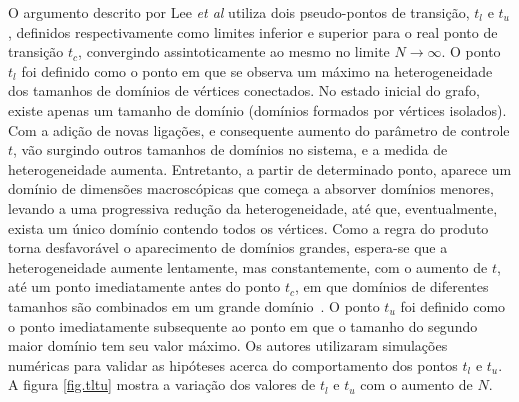 O argumento descrito por Lee \textit{et al} utiliza dois pseudo-pontos de transição, $t_l$ e $t_u$, definidos respectivamente como limites inferior e superior para o real ponto de transição $t_c$, convergindo assintoticamente ao mesmo no limite $N \rightarrow \infty$. O ponto $t_l$ foi definido como o ponto em que se observa um máximo na heterogeneidade dos tamanhos de domínios de vértices conectados. No estado inicial do grafo, existe apenas um tamanho de domínio (domínios formados por vértices isolados). Com a adição de novas ligações, e consequente aumento do parâmetro de controle $t$, vão surgindo outros tamanhos de domínios no sistema, e a medida de heterogeneidade aumenta. Entretanto, a partir de determinado ponto, aparece um domínio de dimensões macroscópicas que começa a absorver domínios menores, levando a uma progressiva redução da heterogeneidade, até que, eventualmente, exista um único domínio contendo todos os vértices. Como a regra do produto torna desfavorável o aparecimento de domínios grandes, espera-se que a heterogeneidade aumente lentamente, mas constantemente, com o aumento de $t$, até um ponto imediatamente antes do ponto $t_c$, em que domínios de diferentes tamanhos são combinados em um grande domínio~\cite{LeeKimPark}. O ponto $t_u$ foi definido como o ponto imediatamente subsequente ao ponto em que o tamanho do segundo maior domínio tem seu valor máximo. Os autores utilizaram simulações numéricas para validar as hipóteses acerca do comportamento dos pontos $t_l$ e $t_u$. A figura \ref{fig.tltu} mostra a variação dos valores de $t_l$ e $t_u$ com o aumento de $N$.


